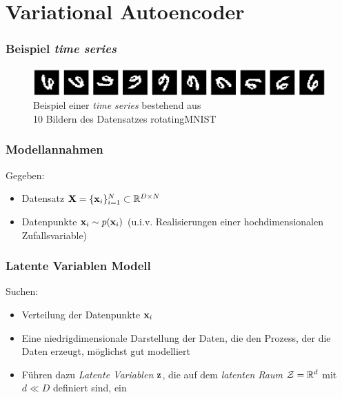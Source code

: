 

\author[Jannis Klingler]{Nix}


\beamertemplatenavigationsymbolsempty{}




\section{Variational Autoencoder}

\begin{frame}
	\frametitle{Beispiel \emph{time series}}
	\begin{figure}[!htbp]
		\includegraphics[scale=0.25]{Bilder/rotatingMNIST}\\
		Beispiel einer \emph{time series} bestehend aus \\10 Bildern des Datensatzes rotatingMNIST
	\end{figure}
\end{frame}

\begin{frame}
	\frametitle{Modellannahmen}
	Gegeben:
	\begin{itemize}
		\item Datensatz $\textbf{X} = \lbrace\mathbf{x}_i \rbrace_{i=1}^{N} \subset \mathbb{R}^{D\times N}$
		\item Datenpunkte $\mathbf{x}_i\sim p(\mathbf{x}_i)$ (u.i.v. Realisierungen einer hochdimensionalen Zufallsvariable)
	\end{itemize}
\end{frame}

\begin{frame}
	\frametitle{Latente Variablen Modell}
	Suchen:
	\begin{itemize}
		\item Verteilung der Datenpunkte $\mathbf{x}_i$
		\item Eine niedrigdimensionale Darstellung der Daten, die den Prozess, der die Daten erzeugt, möglichst gut modelliert
		\item Führen dazu \emph{Latente Variablen} $\mathbf{z}$, die auf dem \emph{latenten Raum} $\mathcal{Z} = \mathbb{R}^d$ mit $d\ll D$ definiert sind, ein
	\end{itemize}
\end{frame}

